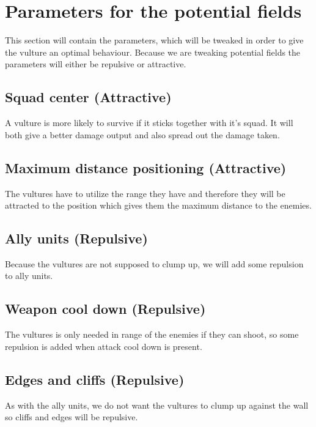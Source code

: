 \section{Parameters for the potential fields}
	This section will contain the parameters, which will be tweaked in order to give the vulture an optimal behaviour. Because we are tweaking 
	potential fields the parameters will either be repulsive or attractive.
	
	\subsection*{Squad center (Attractive)}
		A vulture is more likely to survive if it sticks together with it's squad. It will both give a better damage output and also spread out the 
		damage taken.
	\subsection*{Maximum distance positioning (Attractive)}
		The vultures have to utilize the range they have and therefore they will be attracted to the position which gives them the maximum distance 
		to the enemies.
	\subsection*{Ally units (Repulsive)}
		Because the vultures are not supposed to clump up, we will add some repulsion to ally units.
	\subsection*{Weapon cool down (Repulsive)}
		The vultures is only needed in range of the enemies if they can shoot, so some repulsion is added when attack cool down is present.
	\subsection*{Edges and cliffs (Repulsive)}
		As with the ally units, we do not want the vultures to clump up against the wall so cliffs and edges will be repulsive.
	
	